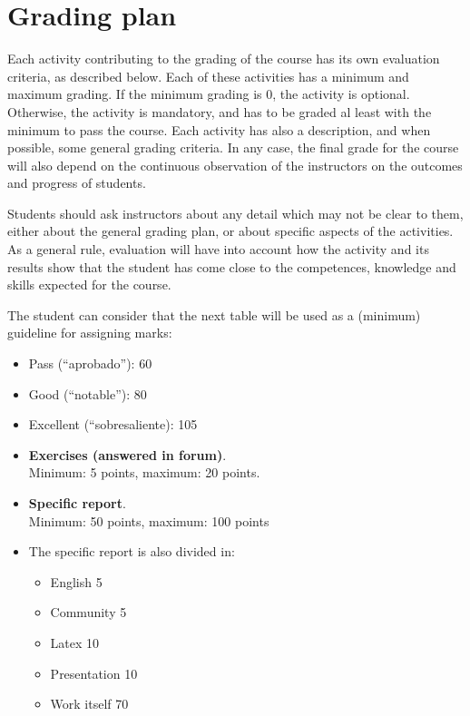\documentclass[a4paper]{article}
\begin{document}
 \section{Grading plan}

 Each activity contributing to the grading of the course has its own evaluation 
criteria, as described below. Each of these activities has a minimum and maximum 
grading. If the minimum grading is 0, the activity is optional. Otherwise, the 
activity is mandatory, and has to be graded al least with the minimum to pass 
the course. Each activity has also a description, and when possible, some general 
grading criteria. In any case, the final grade for the course will also depend on 
the continuous observation of the instructors on the outcomes and progress of students.

 Students should ask instructors about any detail which may not be clear to them, 
either about the general grading plan, or about specific aspects of the activities. 
As a general rule, evaluation will have into account how the activity and its results 
show that the student has come close to the competences, knowledge and skills expected 
for the course.

 The student can consider that the next table will be used as a (minimum) guideline for assigning marks:

 \begin{itemize}
 \item Pass (``aprobado''): 60
 \item Good (``notable''): 80
 \item Excellent (``sobresaliente): 105
 \end{itemize}

 \begin{itemize}
  \item \textbf{Exercises (answered in forum)}. \\
   Minimum: 5 points, maximum: 20 points.




  \item \textbf{Specific report}. \\
   Minimum: 50 points, maximum: 100 points

 \end{itemize}


 \begin{itemize}
  \item The specific report is also divided in:
  \begin{itemize}
    \item English 5
    \item Community 5
    \item Latex 10
    \item Presentation 10
    \item Work itself 70
  \end{itemize}

 \end{itemize}
\end{document}
